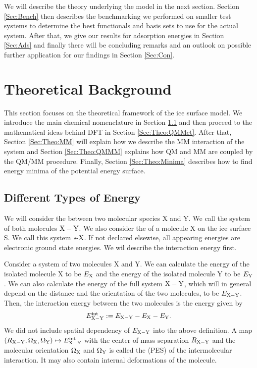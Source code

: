 \documentclass[8.5pt,twoside,twocolumn]{article}
\newcommand\eint{\enmat{E^{\te{int}}}}
\newcommand\sur{\enmat{\te{s-}}}
\theoremstyle{standard}
\begin{document}
We will describe the theory underlying the model in the next section. Section \ref{Sec:Bench} then describes the
benchmarking we performed on smaller test systems to determine the best functionals and basis sets to use for 
the actual system. After that, we give our results for adsorption energies in Section \ref{Sec:Ads} and finally 
there will be concluding remarks and an outlook on possible further application for our findings in Section 
\ref{Sec:Con}.

\section{Theoretical Background}
\label{Sec:Theo}
This section focuses on the theoretical framework of the ice surface model. We introduce the main chemical
nomenclature in Section \ref{Sec:Theo:Interaction} and then proceed to the mathematical ideas behind
DFT in Section \ref{Sec:Theo:QMMet}. After that, Section \ref{Sec:Theo:MM} will explain how we describe
the MM interaction of the system and Section \ref{Sec:Theo:QMMM} explains how QM and MM are coupled
by the QM/MM procedure. Finally, Section \ref{Sec:Theo:Minima} describes how to find energy minima
of the potential energy surface.

\newcommand\X{\enmat{\te X}}
\newcommand\Y{\enmat{\te Y}}
\newcommand\Z{\enmat{\te Z}}
\newcommand\XY{{\enmat{{\X - \Y}}}}
\renewcommand\S{\enmat{\te S}}
\newcommand\sX{\enmat{{\sur\te{X}}}}
\newcommand\A{\enmat{\te A}}
\subsection{Different Types of Energy}
\label{Sec:Theo:Interaction}
We will consider the  between two molecular species X and Y. We call
the system of both molecules $\XY$. We also consider the  of a molecule X on
the ice surface S. We call this system $\sX$. If not declared elsewise, all appearing energies are
electronic ground state energies. We wil describe the interaction energy first.

Consider a system of two molecules X and Y. We can calculate the energy of the isolated molecule X to
be $E_{\text X}$ and the energy of the isolated molecule Y to be $E_{\text Y}$. We can also calculate the 
energy of the full system $\XY$, which will in general depend on the distance and the orientation
of the two molecules, to be $E_{\XY}$. Then, the interaction energy between the two molecules
is the energy given by
\begin{equation}
 \eint_{\XY} := E_{\XY} - E_\X - E_\Y.
 \label{Theo:InteractionEnergy}
\end{equation}
We did not include spatial dependency of $E_{\XY}$ into the above definition. A map
\mbox{$(R_\XY, \Om_\X, \Om_\Y) \mapsto \eint_\XY$} with the center of mass separation
$R_\XY$ and the molecular orientation $\Om_\X$ and $\Om_\Y$ is called the  (PES)
of the intermolecular interaction. It may also contain internal deformations of the molecule.
\end{document}
